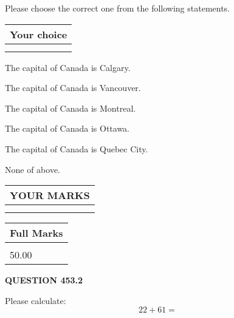 \documentclass[12pt]{article}
\begin{document}
  
Please choose the correct one from the following statements.
  
  
\noindent\hspace{3.0in} \begin{tabular}{|l|}
\hline
Your choice \\
\hline
 \\ 
 \\ 
\hline
\end{tabular}
  
  
 
 
The capital of Canada is Calgary.
 
 
The capital of Canada is Vancouver.
 
 
The capital of Canada is Montreal.
 
 
The capital of Canada is Ottawa.
 
 
The capital of Canada is Quebec City.
 
 
 None of above.
 
 
  
\vspace{0.2in}
  
\noindent\begin{tabular}{|l|}
\hline
 YOUR MARKS  \\
\hline
 \\ 
 \\ 
\hline
\end{tabular}
\hspace{0.05in} \begin{tabular}{|l|}
\hline
 Full Marks  \\
\hline
 \\ 
50.00 \\
\hline
\end{tabular}
{\textbf{\Large{QUESTION
453.2 
}}}
  
  
 
Please calculate:
\begin{equation}
22 +  %
61 = \nonumber
\end{equation}
 

 

 
   
   
 \vspace{0.2in}
 
   
   
   
   
\end{document}
